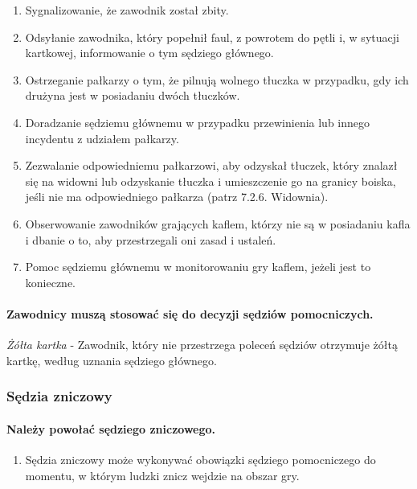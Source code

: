 \documentclass[12pt]{article}
\begin{document}
\begin{enumerate}
	\item Sygnalizowanie, że zawodnik został zbity.

	\item Odsyłanie zawodnika, który popełnił faul, z powrotem do pętli i, w
	      sytuacji kartkowej, informowanie o tym sędziego głównego.

	\item Ostrzeganie pałkarzy o tym, że pilnują wolnego tłuczka w przypadku,
	      gdy ich drużyna jest w posiadaniu dwóch tłuczków.

	\item Doradzanie sędziemu głównemu w przypadku przewinienia lub innego
	      incydentu z udziałem pałkarzy.

	\item Zezwalanie odpowiedniemu pałkarzowi, aby odzyskał tłuczek, który
	      znalazł się na widowni lub odzyskanie tłuczka i umieszczenie go na
	      granicy boiska, jeśli nie ma odpowiedniego pałkarza (patrz 7.2.6.
	      Widownia).

	\item Obserwowanie zawodników grających kaflem, którzy nie są w posiadaniu
	      kafla i dbanie o to, aby przestrzegali oni zasad i ustaleń.

	\item Pomoc sędziemu głównemu w monitorowaniu gry kaflem, jeżeli jest to
	      konieczne.
\end{enumerate}

\paragraph{Zawodnicy muszą stosować się do decyzji sędziów
	pomocniczych.}

\emph{Żółta kartka} - Zawodnik, który nie przestrzega poleceń sędziów
otrzymuje żółtą kartkę, według uznania sędziego głównego.

\subsubsection{Sędzia zniczowy}

\paragraph{Należy powołać sędziego zniczowego.}

\begin{enumerate}
	\item
	      Sędzia zniczowy może wykonywać obowiązki sędziego pomocniczego do
	      momentu, w którym ludzki znicz wejdzie na obszar gry.
\end{enumerate}
\end{document}
